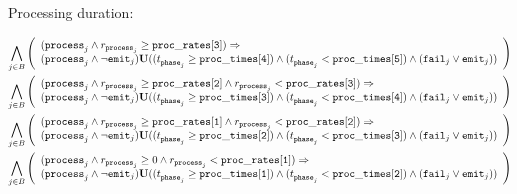 Processing duration:

\begin{align*}
%
\bigwedge_{
	\begin{subarray}{c}
	j \in B\\
	\end{subarray}
}
\left( \begin{array}{l}
(\p{j} \land \rp{j} \geq \mathtt{proc\_rates[3]}) \Rightarrow \\
(\p{j} \land \lnot \e{j}) \U (( \tph{j}{} \geq \mathtt{proc\_times[4]}) \land ( \tph{j}{} < \mathtt{proc\_times[5]}) \land (\f{j} \lor \e{j}) )
\end{array} \right)\\ 
%
%
%
\bigwedge_{
	\begin{subarray}{c}
	j \in B\\
	\end{subarray}
}
\left( \begin{array}{l}
(\p{j} \land \rp{j} \geq \mathtt{proc\_rates[2]} \land \rp{j} < \mathtt{proc\_rates[3]}) \Rightarrow \\
(\p{j} \land \lnot \e{j}) \U (( \tph{j}{} \geq \mathtt{proc\_times[3]}) \land ( \tph{j}{} < \mathtt{proc\_times[4]}) \land (\f{j} \lor \e{j}) )
\end{array} \right)\\ 
%
%
%
\bigwedge_{
	\begin{subarray}{c}
	j \in B\\
	\end{subarray}
}
\left( \begin{array}{l}
(\p{j} \land \rp{j} \geq \mathtt{proc\_rates[1]} \land \rp{j} < \mathtt{proc\_rates[2]}) \Rightarrow \\
(\p{j} \land \lnot \e{j}) \U (( \tph{j}{} \geq \mathtt{proc\_times[2]}) \land ( \tph{j}{} < \mathtt{proc\_times[3]}) \land (\f{j} \lor \e{j}) )
\end{array} \right)\\ 
%
%
%
\bigwedge_{
	\begin{subarray}{c}
	j \in B\\
	\end{subarray}
}
\left( \begin{array}{l}
(\p{j} \land \rp{j} \geq 0 \land \rp{j} < \mathtt{proc\_rates[1]}) \Rightarrow \\
(\p{j} \land \lnot \e{j}) \U (( \tph{j}{} \geq \mathtt{proc\_times[1]}) \land ( \tph{j}{} < \mathtt{proc\_times[2]}) \land (\f{j} \lor \e{j}) )
\end{array} \right)\\ 
%
\end{align*}

